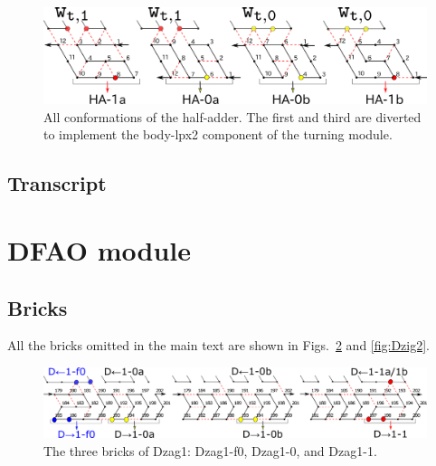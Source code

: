 \documentclass[runningheads]{llncs}
\begin{document}
\begin{figure}[htb]
\vspace*{-5mm}
\centering
\includegraphics[width=\linewidth]{Figs/counter_zig.png}
\caption{All conformations of the half-adder.
The first and third are diverted to implement the body-lpx2 component of the turning module. 
}
\label{fig:half-adder}
\end{figure}


	\subsection{Transcript}

	\section{DFAO module}
	\label{sect:appendix_DFAO_module}

	\subsection{Bricks}
	\label{ap_subsect:DFAO_module_bricks}

All the bricks omitted in the main text are shown in Figs.~\ref{fig:Dzag1} and \ref{fig:Dzig2}. 

\begin{figure}[h]
\centering
\includegraphics[width=\linewidth]{Figs/DFAO-zag1.png}
\caption{The three bricks of Dzag1: Dzag1-f0, Dzag1-0, and Dzag1-1.}
\label{fig:Dzag1}
\end{figure}
\end{document}
